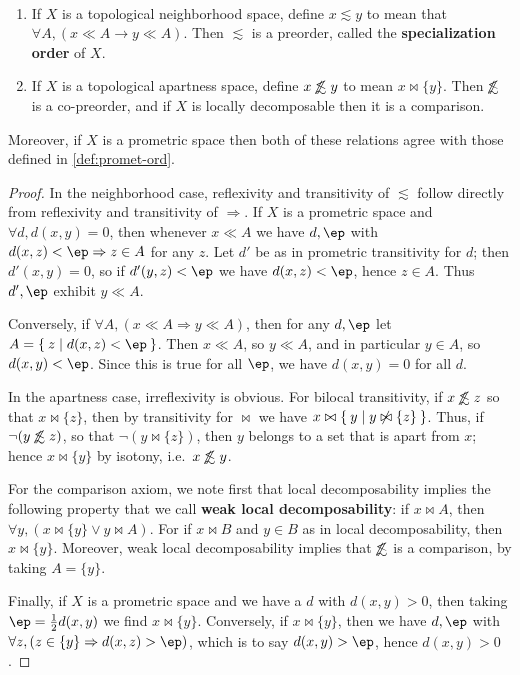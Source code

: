\documentclass{article}
\def\oapt{\mathrel{\!\not\,\not\lesssim}}
\def\leapx{\lesssim}
\let\implies\Rightarrow
\def\singleton#1{\{#1\}}
\begin{document}
\begin{thm}\label{thm:top-ord}\ 
  \begin{enumerate}
  \item If $X$ is a topological neighborhood space, define $x\leapx y$ to mean that $\forall A, (x\ll A \to y\ll A)$.
    Then $\leapx$ is a preorder, called the \textbf{specialization order} of $X$.
  \item If $X$ is a topological apartness space, define $x\oapt y$ to mean $x \bowtie \singleton{y}$.
    Then $\oapt$ is a co-preorder, and if $X$ is locally decomposable then it is a comparison.
  \end{enumerate}
  Moreover, if $X$ is a prometric space then both of these relations agree with those defined in \cref{def:promet-ord}.
\end{thm}
\begin{proof}
  In the neighborhood case, reflexivity and transitivity of $\leapx$ follow directly from reflexivity and transitivity of $\implies$.
  If $X$ is a prometric space and $\forall d, d(x,y)=0$, then whenever $x\ll A$ we have $d,\ep$ with $d(x,z)<\ep \implies z\in A$ for any $z$.
  Let $d'$ be as in prometric transitivity for $d$; then $d'(x,y)=0$, so if $d'(y,z)<\ep$ we have $d(x,z)<\ep$, hence $z\in A$.
  Thus $d',\ep$ exhibit $y\ll A$.

  Conversely, if $\forall A, (x\ll A \implies y\ll A)$, then for any $d,\ep$ let $A = \setof{z|d(x,z)<\ep}$.
  Then $x\ll A$, so $y\ll A$, and in particular $y\in A$, so $d(x,y)<\ep$.
  Since this is true for all $\ep$, we have $d(x,y)=0$ for all $d$.

  In the apartness case, irreflexivity is obvious.
  For bilocal transitivity, if $x\oapt z$ so that $x\bowtie \{z\}$, then by transitivity for $\bowtie$ we have $x \bowtie \Set{y|y\not \bowtie \{z\}}$.
  Thus, if $\neg (y\oapt z)$, so that $\neg (y\bowtie \{z\})$, then $y$ belongs to a set that is apart from $x$; hence $x\bowtie \{y\}$ by isotony, i.e.\ $x\oapt y$.

  For the comparison axiom, we note first that local decomposability implies the following property that we call \textbf{weak local decomposability}: if $x\bowtie A$, then $\forall y, (x\bowtie \singleton{y} \lor y\bowtie A)$.
  For if $x\bowtie B$ and $y\in B$ as in local decomposability, then $x\bowtie \singleton{y}$.
  Moreover, weak local decomposability implies that $\oapt$ is a comparison, by taking $A = \singleton{y}$.

  Finally, if $X$ is a prometric space and we have a $d$ with $d(x,y)>0$, then taking $\ep=\frac12 d(x,y)$ we find $x\bowtie \singleton{y}$.
  Conversely, if $x\bowtie \singleton{y}$, then we have $d,\ep$ with $\forall z, (z\in \singleton{y} \implies d(x,z)>\ep)$, which is to say $d(x,y)>\ep$, hence $d(x,y)>0$.
\end{proof}
\end{document}
